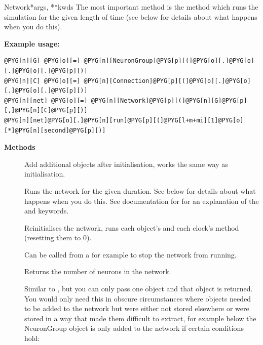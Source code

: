\documentclass[letterpaper,10pt,english]{manual}
\begin{document}
\begin{classdesc}{Network}{*args, **kwds}
The most important method is the  method which runs the simulation
for the given length of time (see below for details about what happens when you
do this).

\textbf{Example usage:}

\begin{Verbatim}[commandchars=@\[\]]
@PYG[n][G] @PYG[o][=] @PYG[n][NeuronGroup]@PYG[p][(]@PYG[o][.]@PYG[o][.]@PYG[o][.]@PYG[p][)]
@PYG[n][C] @PYG[o][=] @PYG[n][Connection]@PYG[p][(]@PYG[o][.]@PYG[o][.]@PYG[o][.]@PYG[p][)]
@PYG[n][net] @PYG[o][=] @PYG[n][Network]@PYG[p][(]@PYG[n][G]@PYG[p][,]@PYG[n][C]@PYG[p][)]
@PYG[n][net]@PYG[o][.]@PYG[n][run]@PYG[p][(]@PYG[l+m+mi][1]@PYG[o][*]@PYG[n][second]@PYG[p][)]
\end{Verbatim}

\textbf{Methods}
\begin{description}
\item[] \leavevmode
Add additional objects after initialisation, works the same way
as initialisation.

\item[] \leavevmode
Runs the network for the given duration. See below for details about
what happens when you do this. See documentation for \hyperlink{brian.run}{} for
an explanation of the  and  keywords.

\item[] \leavevmode
Reinitialises the network, runs each object's  and each
clock's  method (resetting them to 0).

\item[] \leavevmode
Can be called from a \hyperlink{brian.network_operation}{} for example to stop the
network from running.

\item[] \leavevmode
Returns the number of neurons in the network.

\item[] \leavevmode
Similar to , but you can only pass one object and that
object is returned. You would only need this in obscure
circumstances where objects needed to be added to the network
but were either not stored elsewhere or were stored in a way
that made them difficult to extract, for example below the
NeuronGroup object is only added to the network if certain
conditions hold:


\end{description}
\end{classdesc}
\end{document}
